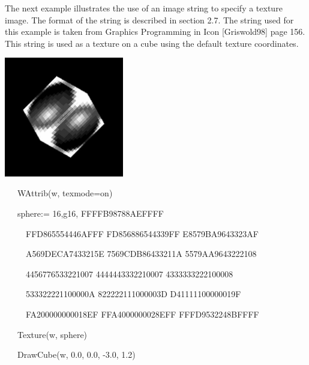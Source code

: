 \documentclass[letterpaper]{article}
\begin{document}
{\bigskip

The next example illustrates the use of an image string to specify a
texture image. The format of the string is described in section
2.7. The string used for this example is taken from Graphics
Programming in Icon [Griswold98] page 156. This string is used as a
texture on a cube using the default texture coordinates.


\bigskip

{\centering  \includegraphics[width=2.0508in,height=2.0571in]{utr9/utr9-img027.jpg} \par}

\bigskip

{\sffamily
\ \ \ WAttrib(w, {\textquotedbl}texmode=on{\textquotedbl})}

{\sffamily
\ \ \ sphere:= {\textquotedbl}16,g16, FFFFB98788AEFFFF{\textquotedbl} {\textbar}{\textbar}}

{\sffamily
\ \ \ \ \ {\textquotedbl}FFD865554446AFFF FD856886544339FF E8579BA9643323AF{\textquotedbl}{\textbar}{\textbar}}

{\sffamily
\ \ \ \ \ {\textquotedbl}A569DECA7433215E 7569CDB86433211A 5579AA9643222108{\textquotedbl}{\textbar}{\textbar}}

{\sffamily
\ \ \ \ \ {\textquotedbl}4456776533221007 4444443332210007 4333333222100008{\textquotedbl}{\textbar}{\textbar}}

{\sffamily
\ \ \ \ \ {\textquotedbl}533322221100000A 822222111000003D D41111100000019F{\textquotedbl}{\textbar}{\textbar}}

{\sffamily
\ \ \ \ \ {\textquotedbl}FA200000000018EF FFA4000000028EFF FFFD9532248BFFFF{\textquotedbl}}

{\sffamily
\ \ \ Texture(w, sphere)}

{\sffamily
\ \ \ DrawCube(w, 0.0, 0.0, -3.0, 1.2)}


}
\end{document}

